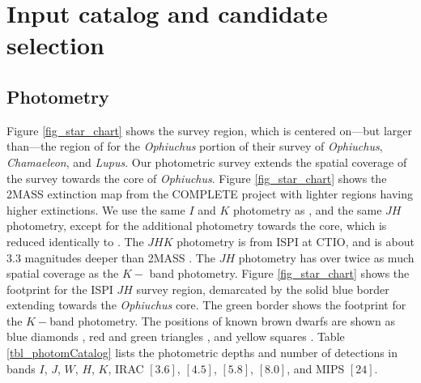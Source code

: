 \section{Input catalog and candidate selection}
\subsection{Photometry}
Figure \ref{fig_star_chart} shows the survey region, which is centered on---but larger than---the region of \citet{allers06} for the \emph{Ophiuchus} portion of their survey of \emph{Ophiuchus}, \emph{Chamaeleon}, and \emph{Lupus}.  Our photometric survey extends the spatial coverage of the \citet{allers06} survey towards the core of \emph{Ophiuchus}.  Figure \ref{fig_star_chart} shows the 2MASS extinction map \citep{2008A&A...489..143L} from the COMPLETE project \citep{2006AJ....131.2921R} with lighter regions having higher extinctions.  We use the same $I$ and $K$ photometry as \citet{allers06}, and the same $JH$ photometry, except for the additional photometry towards the core, which is reduced identically to \citet{allers06}.  The $JHK$ photometry is from ISPI at CTIO, and is about 3.3 magnitudes deeper than 2MASS \citep{allers06}.  The $JH$ photometry has over twice as much spatial coverage as the $K-$ band photometry.  Figure \ref{fig_star_chart} shows the footprint for the ISPI $JH$ survey region, demarcated by the solid blue border extending towards the \emph{Ophiuchus} core.  The green border shows the footprint for the $K-$band photometry.  The positions of known brown dwarfs are shown as blue diamonds \citep{allers06}, red and green triangles \citep{2013A&A...559A.126A}, and yellow squares \citep{2006AJ....131.3016S}.  Table \ref{tbl_photomCatalog} lists the photometric depths and number of detections in bands $I$, $J$, $W$, $H$, $K$, IRAC $[3.6]$, $[4.5]$, $[5.8]$, $[8.0]$, and MIPS $[24]$.


